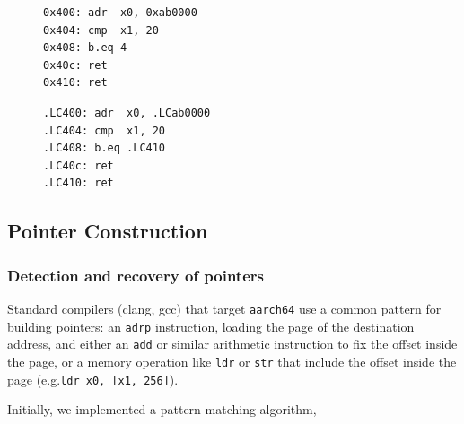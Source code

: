 \documentclass[a4paper,11pt,oneside]{report}
\begin{document}
\begin{figure}[h]
\label{lst:diffass}
\begin{minipage}{.45\textwidth}

\begin{lstlisting}
0x400: adr  x0, 0xab0000
0x404: cmp  x1, 20
0x408: b.eq 4
0x40c: ret
0x410: ret
\end{lstlisting}


\end{minipage}\hfill
\begin{minipage}{.45\textwidth}

\begin{lstlisting}
.LC400: adr  x0, .LCab0000
.LC404: cmp  x1, 20
.LC408: b.eq .LC410
.LC40c: ret
.LC410: ret
\end{lstlisting}

\end{minipage}
\end{figure}



\subsection{Pointer Construction}

\subsubsection{Detection and recovery of pointers}

Standard compilers (clang, gcc) that target \texttt{aarch64} use a common 
pattern for building pointers: an \texttt{adrp} instruction, loading the page 
of the destination address, and either an \texttt{add} or similar arithmetic 
instruction to fix the offset inside the page, or a memory operation like 
\texttt{ldr} or \texttt{str} that include the offset inside the page 
(e.g.\texttt{ldr x0, [x1, 256]}).

Initially, we implemented a pattern matching algorithm, 
\end{document}
